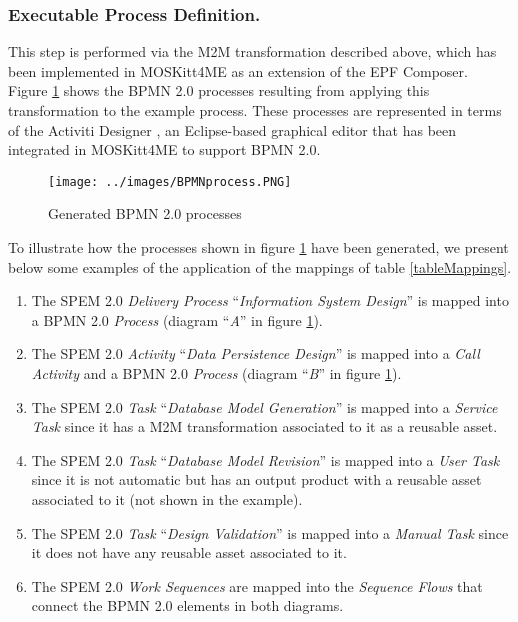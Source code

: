 \documentclass[runningheads,a4paper]{llncs}
\begin{document}
\subsubsection{Executable Process Definition.}

This step is performed via the M2M transformation described above, which has
been implemented in MOSKitt4ME as an extension of the EPF Composer. Figure
\ref{BPMNprocess} shows the BPMN 2.0 processes resulting from applying this
transformation to the example process. These processes are represented in terms
of the Activiti Designer \cite{activiti}, an Eclipse-based graphical editor that
has been integrated in MOSKitt4ME to support BPMN 2.0.

\begin{figure}
\centering
\texttt{[image: ../images/BPMNprocess.PNG]}
\caption{Generated BPMN 2.0 processes}
\label{BPMNprocess}
\end{figure}

To illustrate how the processes shown in figure \ref{BPMNprocess} have
been generated, we present below some examples of the application of the
mappings of table \ref{tableMappings}.

\begin{enumerate}
  \item The SPEM 2.0 \textit{Delivery Process} ``\textit{Information System
  Design}'' is mapped into a BPMN 2.0 \textit{Process} (diagram
  ``\textit{A}'' in figure \ref{BPMNprocess}).
  
  \item The SPEM 2.0 \textit{Activity} ``\textit{Data Persistence Design}'' is
  mapped into a \textit{Call Activity} and a BPMN 2.0 \textit{Process}
  (diagram ``\textit{B}'' in figure \ref{BPMNprocess}).
  
  \item The SPEM 2.0 \textit{Task} ``\textit{Database Model Generation}'' is
  mapped into a \textit{Service Task} since it has a M2M transformation
  associated to it as a reusable asset.
  
  \item The SPEM 2.0 \textit{Task} ``\textit{Database Model Revision}'' is mapped
  into a \textit{User Task} since it is not automatic but has an output product with a
  reusable asset associated to it (not shown in the example).
  
  \item The SPEM 2.0 \textit{Task} ``\textit{Design Validation}'' is mapped into
  a \textit{Manual Task} since it does not have any reusable asset associated to
  it.
  
  \item The SPEM 2.0 \textit{Work Sequences} are mapped into the
  \textit{Sequence Flows} that connect the BPMN 2.0 elements in both diagrams.
\end{enumerate}
\end{document}
